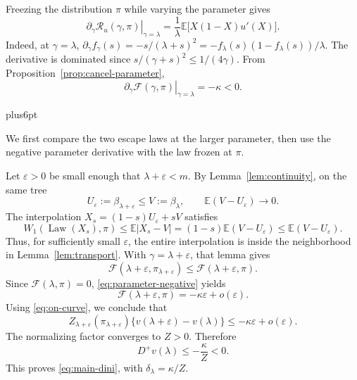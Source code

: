 \documentclass[11pt,reqno]{amsart}
\makeatletter
\theoremstyle{plain}
\theoremstyle{definition}
\theoremstyle{remark}
\renewenvironment{proof}[1][\proofname]{%
  \par
  \pushQED{\qed}%
  \normalfont
  \topsep6pt plus6pt\relax
  \trivlist
  \item[\hskip\labelsep\slshape #1\@addpunct{.}]%
  \ignorespaces
}{%
  \popQED
  \endtrivlist
  \@endpefalse
}
\DeclareRobustCommand{\qed}{%
  \leavevmode\unskip\penalty9999\hbox{}\nobreak
  \ifmmode
    \makebox[0pt][l]{\qquad\hbox{\qedsymbol}}%
  \else
    \qquad\hbox{\qedsymbol}%
  \fi
}
\renewcommand{\qedsymbol}{\rule[.47pt]{4pt}{6pt}}
\numberwithin{equation}{section}
\newcommand{\E}{\mathbb E}
\newcommand{\Law}{\operatorname{Law}}
\newcommand{\Dplus}{D^{+}}
\newcommand{\cF}{\mathcal F}
\newcommand{\res}{\mathcal R}
\makeatother
\begin{document}
Freezing the distribution $\pi$ while varying the parameter gives
\begin{equation}\label{eq:parameter-residual}
 \left.\partial_\gamma\res_u(\gamma,\pi)\right|_{\gamma=\lambda}
 =\frac1\lambda\E\bigl[X(1-X)u'(X)\bigr].
\end{equation}
Indeed, at $\gamma=\lambda$,
$\partial_\gamma f_\gamma(s)=-s/(\lambda+s)^2
=-f_\lambda(s)(1-f_\lambda(s))/\lambda$.
The derivative is dominated since
$s/(\gamma+s)^2\le1/(4\gamma)$. From Proposition~\ref{prop:cancel-parameter},
\begin{equation}\label{eq:parameter-negative}
 \left.\partial_\gamma\cF(\gamma,\pi)\right|_{\gamma=\lambda}
 =-\kappa<0.
\end{equation}

\begin{proof}[First proof of \eqref{eq:main-dini}]
We first compare the two escape laws at the larger parameter, then use
the negative parameter derivative with the law frozen at $\pi$.

Let $\varepsilon>0$ be small enough that $\lambda+\varepsilon<m$.
By Lemma~\ref{lem:continuity}, on the same tree
\[
 U_\varepsilon:=\beta_{\lambda+\varepsilon}\le
 V:=\beta_\lambda,
 \qquad \E(V-U_\varepsilon)\longrightarrow0.
\]
The interpolation $X_s=(1-s)U_\varepsilon+sV$ satisfies
\begin{equation}\label{eq:interpolation-ball}
 W_1(\Law(X_s),\pi)
 \le\E|X_s-V|
 =(1-s)\E(V-U_\varepsilon)
 \le\E(V-U_\varepsilon).
\end{equation}
Thus, for sufficiently small $\varepsilon$, the entire interpolation is
inside the neighborhood in Lemma~\ref{lem:transport}. With
$\gamma=\lambda+\varepsilon$, that lemma gives
\begin{equation}\label{eq:law-comparison}
 \cF(\lambda+\varepsilon,\pi_{\lambda+\varepsilon})
 \le\cF(\lambda+\varepsilon,\pi).
\end{equation}
Since $\cF(\lambda,\pi)=0$, \eqref{eq:parameter-negative} yields
\[
 \cF(\lambda+\varepsilon,\pi)=-\kappa\varepsilon+o(\varepsilon).
\]
Using \eqref{eq:on-curve}, we conclude that
\begin{equation}\label{eq:finite-comparison}
 Z_{\lambda+\varepsilon}(\pi_{\lambda+\varepsilon})
 \{v(\lambda+\varepsilon)-v(\lambda)\}
 \le-\kappa\varepsilon+o(\varepsilon).
\end{equation}
The normalizing factor converges to $Z>0$. Therefore
\begin{equation}\label{eq:explicit-dini}
 \boxed{\quad \Dplus v(\lambda)\le-\frac{\kappa}{Z}<0.\quad}
\end{equation}
This proves \eqref{eq:main-dini}, with $\delta_\lambda=\kappa/Z$.

\end{proof}
\end{document}

